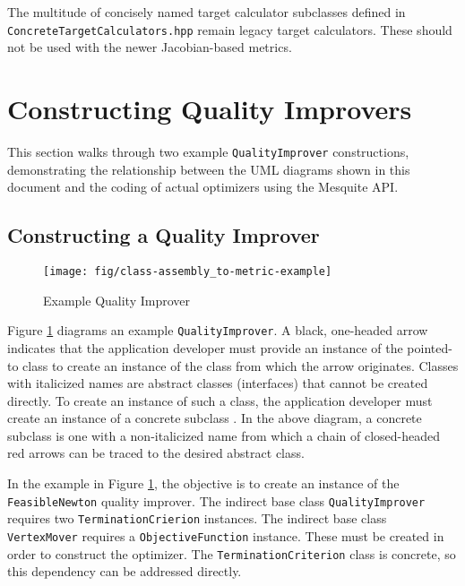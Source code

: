 \documentclass{article}
\begin{document}
The multitude of concisely named target calculator subclasses defined in \texttt{ConcreteTargetCalculators.hpp} remain legacy target calculators.  These should not be used with the newer Jacobian-based metrics.

\section{Constructing Quality Improvers}

This section walks through two example \texttt{QualityImprover} constructions, demonstrating the relationship between the UML diagrams shown in this document and the coding of actual optimizers using the Mesquite API.

\subsection{Constructing a Quality Improver}
\label{sec:ex1}

\begin{figure}[htb]
\begin{center}
\texttt{[image: fig/class-assembly\_to-metric-example]}
\caption{Example Quality Improver\label{fig:qiexample}}
\end{center}
\end{figure}

Figure \ref{fig:qiexample} diagrams an example \texttt{QualityImprover}.  A black, one-headed arrow indicates that the application developer must provide an instance of the pointed-to class to create an instance of the class from which the arrow originates.  Classes with italicized names are abstract classes (interfaces) that cannot be created directly.  To create an instance of such a class, the application developer must create an instance of a concrete subclass .  In the above diagram, a concrete subclass is one with a non-italicized name from which a chain of closed-headed red arrows can be traced to the desired abstract class.

In the example in Figure \ref{fig:qiexample}, the objective is to create an instance of the \texttt{FeasibleNewton} quality improver.  The indirect base class \texttt{QualityImprover} requires two \texttt{TerminationCrierion} instances.   The indirect base class \texttt{VertexMover} requires a \texttt{ObjectiveFunction} instance. These must be created in order to construct the optimizer.  The \texttt{TerminationCriterion} class is concrete, so this dependency can be addressed directly.
\end{document}

